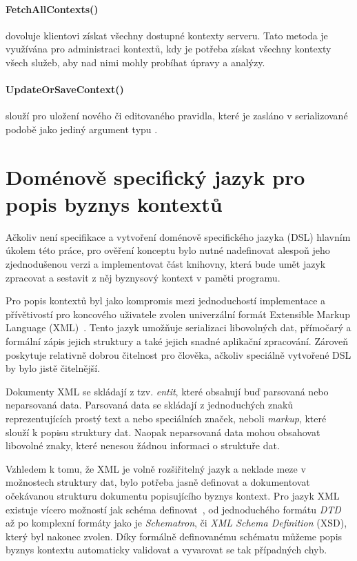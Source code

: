 \paragraph{FetchAllContexts()} dovoluje klientovi získat všechny
dostupné kontexty serveru. Tato metoda je využívána pro administraci
kontextů, kdy je potřeba získat všechny kontexty všech služeb, aby
nad nimi mohly probíhat úpravy a analýzy.

\paragraph{UpdateOrSaveContext()} slouží pro uložení nového či
editovaného pravidla, které je zasláno v serializované podobě
jako jediný argument typu .

\section{Doménově specifický jazyk pro popis byznys kontextů}\label{sec:dsl-impl}

Ačkoliv není specifikace a vytvoření doménově specifického jazyka (DSL)
hlavním úkolem této práce, pro ověření konceptu bylo nutné nadefinovat
alespoň jeho zjednodušenou verzi a implementovat část knihovny, která
bude umět jazyk zpracovat a sestavit z něj byznysový kontext v paměti programu.

Pro popis kontextů byl jako kompromis mezi jednoduchostí implementace
a přívětivostí pro koncového uživatele zvolen univerzální formát Extensible
Markup Language (XML)~\cite{bray1997extensible}. Tento
jazyk umožňuje serializaci libovolných dat, přímočarý a formální
zápis jejich struktury a také jejich snadné aplikační zpracování.
Zároveň poskytuje relativně dobrou čitelnost pro člověka, ačkoliv
speciálně vytvořené DSL by bylo jistě čitelnější.

Dokumenty XML se skládají z tzv. \textit{entit}, které obsahují
buď parsovaná nebo neparsovaná data. Parsovaná data se skládají
z jednoduchých znaků reprezentujících prostý text a nebo
speciálních značek, neboli \textit{markup}, které slouží k popisu
struktury dat. Naopak neparsovaná data mohou obsahovat libovolné
znaky, které nenesou žádnou informaci o struktuře dat.

Vzhledem k tomu, že XML je volně rozšiřitelný jazyk a neklade
meze v možnostech struktury dat, bylo potřeba jasně definovat
a dokumentovat očekávanou strukturu dokumentu popisujícího
byznys kontext. Pro jazyk XML existuje vícero možností jak schéma
definovat~\cite{lee2000comparative}, od jednoduchého formátu
\textit{DTD} až po komplexní formáty jako je \textit{Schematron}, či
\textit{XML Schema Definition} (XSD), který byl nakonec zvolen.
Díky formálně definovanému schématu můžeme popis byznys kontextu
automaticky validovat a vyvarovat se tak případných chyb.

